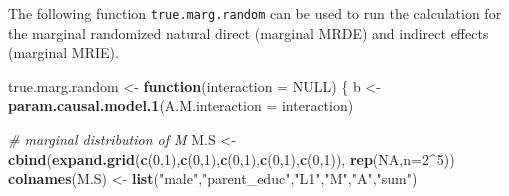 \documentclass[
]{book}
\newenvironment{Shaded}{\begin{snugshade}}{\end{snugshade}}
\newcommand{\AttributeTok}[1]{\textcolor[rgb]{0.13,0.29,0.53}{#1}}
\newcommand{\CommentTok}[1]{\textcolor[rgb]{0.56,0.35,0.01}{\textit{#1}}}
\newcommand{\ConstantTok}[1]{\textcolor[rgb]{0.56,0.35,0.01}{#1}}
\newcommand{\ControlFlowTok}[1]{\textcolor[rgb]{0.13,0.29,0.53}{\textbf{#1}}}
\newcommand{\DecValTok}[1]{\textcolor[rgb]{0.00,0.00,0.81}{#1}}
\newcommand{\FunctionTok}[1]{\textcolor[rgb]{0.13,0.29,0.53}{\textbf{#1}}}
\newcommand{\NormalTok}[1]{#1}
\newcommand{\OtherTok}[1]{\textcolor[rgb]{0.56,0.35,0.01}{#1}}
\newcommand{\SpecialCharTok}[1]{\textcolor[rgb]{0.81,0.36,0.00}{\textbf{#1}}}
\newcommand{\StringTok}[1]{\textcolor[rgb]{0.31,0.60,0.02}{#1}}
\begin{document}
The following function \texttt{true.marg.random} can be used to run the calculation for the marginal randomized natural direct (marginal MRDE) and indirect effects (marginal MRIE).

\begin{Shaded}
\begin{Highlighting}[]
\NormalTok{true.marg.random }\OtherTok{\textless{}{-}} \ControlFlowTok{function}\NormalTok{(}\AttributeTok{interaction =} \ConstantTok{NULL}\NormalTok{) \{}
\NormalTok{  b }\OtherTok{\textless{}{-}} \FunctionTok{param.causal.model.1}\NormalTok{(}\AttributeTok{A.M.interaction =}\NormalTok{ interaction)}
  
  \CommentTok{\# marginal distribution of M}
\NormalTok{  M.S }\OtherTok{\textless{}{-}} \FunctionTok{cbind}\NormalTok{(}\FunctionTok{expand.grid}\NormalTok{(}\FunctionTok{c}\NormalTok{(}\DecValTok{0}\NormalTok{,}\DecValTok{1}\NormalTok{),}\FunctionTok{c}\NormalTok{(}\DecValTok{0}\NormalTok{,}\DecValTok{1}\NormalTok{),}\FunctionTok{c}\NormalTok{(}\DecValTok{0}\NormalTok{,}\DecValTok{1}\NormalTok{),}\FunctionTok{c}\NormalTok{(}\DecValTok{0}\NormalTok{,}\DecValTok{1}\NormalTok{),}\FunctionTok{c}\NormalTok{(}\DecValTok{0}\NormalTok{,}\DecValTok{1}\NormalTok{)), }\FunctionTok{rep}\NormalTok{(}\ConstantTok{NA}\NormalTok{,}\AttributeTok{n=}\DecValTok{2}\SpecialCharTok{\^{}}\DecValTok{5}\NormalTok{))}
  \FunctionTok{colnames}\NormalTok{(M.S) }\OtherTok{\textless{}{-}} \FunctionTok{list}\NormalTok{(}\StringTok{"male"}\NormalTok{,}\StringTok{"parent\_educ"}\NormalTok{,}\StringTok{"L1"}\NormalTok{,}\StringTok{"M"}\NormalTok{,}\StringTok{"A"}\NormalTok{,}\StringTok{"sum"}\NormalTok{)}
  

\end{Highlighting}
\end{Shaded}
\end{document}
